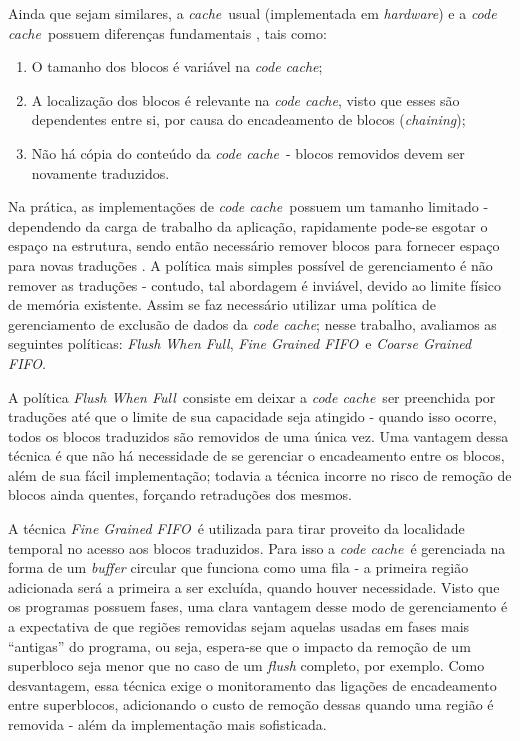 \documentclass[12pt,twoside]{article}
\newcommand{\ccache}{\emph{code cache}}
\newcommand{\cache}{\emph{cache}}
\newcommand{\flush}{\emph{Flush When Full}}
\newcommand{\finefifo}{\emph{Fine Grained FIFO}}
\newcommand{\coarsefifo}{\emph{Coarse Grained FIFO}}
\newcommand{\qq}[1]{``#1''}
\begin{document}
Ainda que sejam similares, a \cache~usual (implementada em \emph{hardware}) e a \ccache~possuem diferenças fundamentais \cite{smith-vm-book}, tais como:

\begin{enumerate}
\item O tamanho dos blocos é variável na \ccache;

\item A localização dos blocos é relevante na \ccache, visto que esses são dependentes entre si, por causa do encadeamento de blocos (\emph{chaining});

\item Não há cópia do conteúdo da \ccache~- blocos removidos devem ser novamente traduzidos.
\end{enumerate}

Na prática, as implementações de \ccache~possuem um tamanho limitado - dependendo da carga de trabalho da aplicação, rapidamente pode-se esgotar o espaço na estrutura, sendo então necessário remover blocos para fornecer espaço para novas traduções \cite{kim-2004}. A política mais simples possível de gerenciamento é não remover as traduções - contudo, tal abordagem é inviável, devido ao limite físico de memória existente. Assim se faz necessário utilizar uma política de gerenciamento de exclusão de dados da \ccache; nesse trabalho, avaliamos as seguintes políticas: \flush, \finefifo~e \coarsefifo.

A política \flush~consiste em deixar a \ccache~ser preenchida por traduções até que o limite de sua capacidade seja atingido - quando isso ocorre, todos os blocos traduzidos são removidos de uma única vez. Uma vantagem dessa técnica é que não há necessidade de se gerenciar o encadeamento entre os blocos, além de sua fácil implementação; todavia a técnica incorre no risco de remoção de blocos ainda quentes, forçando retraduções dos mesmos. 

A técnica \finefifo~é utilizada para tirar proveito da localidade temporal no acesso aos blocos traduzidos. Para isso a \ccache~é gerenciada na forma de um \emph{buffer} circular que funciona como uma fila - a primeira região adicionada será a primeira a ser excluída, quando houver necessidade. Visto que os programas possuem fases, uma clara vantagem desse modo de gerenciamento é a expectativa de que regiões removidas sejam aquelas usadas em fases mais \qq{antigas} do programa, ou seja, espera-se que o impacto da remoção de um superbloco seja menor que no caso de um \emph{flush} completo, por exemplo. Como desvantagem, essa técnica exige o monitoramento das ligações de encadeamento entre superblocos, adicionando o custo de remoção dessas quando uma região é removida - além da implementação mais sofisticada.
\end{document}
